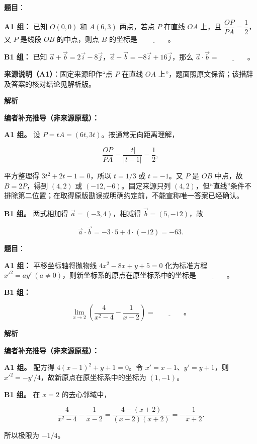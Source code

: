 \begin{answer}

\textbf{题目}：

\textbf{A1 组：} 已知 $O(0,0)$ 和 $A(6,3)$ 两点，若点 $P$ 在直线 $OA$ 上，且 $\dfrac{OP}{PA}=\dfrac12$，又 $P$ 是线段 $OB$ 的中点，则点 $B$ 的坐标是 $\underline{\qquad\qquad}$。

\textbf{B1 组：} 已知 $\vec a+\vec b=2\vec i-8\vec j$，$\vec a-\vec b=-8\vec i+16\vec j$，那么 $\vec a\cdot\vec b=\underline{\qquad\qquad}$。

\begin{gktip}
\textbf{来源说明（A1）}：固定来源印作“点 $P$ 在直线 $OA$ 上”，题面照原文保留；该措辞及答案的核对结论见解析版。
\end{gktip}

\textbf{解析}

\textbf{编者补充推导（非来源原载）：}

\textbf{A1 组。} 设 $P=tA=(6t,3t)$。按通常无向距离理解，

\nopagebreak[4]
\[\frac{OP}{PA}=\frac{|t|}{|t-1|}=\frac12,\]

平方整理得 $3t^2+2t-1=0$，所以 $t=1/3$ 或 $t=-1$。又 $P$ 是 $OB$ 中点，故 $B=2P$，得到 $(4,2)$ 或 $(-12,-6)$。固定来源只列 $(4,2)$，但“直线”条件不排除第二位置；在取得原版勘误或明确约定前，不能宣称唯一答案已经确认。

\textbf{B1 组。} 两式相加得 $\vec a=(-3,4)$，相减得 $\vec b=(5,-12)$，故

\nopagebreak[4]
\[\vec a\cdot\vec b=-3\cdot5+4\cdot(-12)=-63.\]


\end{answer}
\begin{answer}

\textbf{题目}：

\textbf{A1 组：} 平移坐标轴将抛物线 $4x^2-8x+y+5=0$ 化为标准方程 $x'^2=ay'\ (a\ne0)$，则新坐标系的原点在原坐标系中的坐标是 $\underline{\qquad\qquad}$。

\textbf{B1 组：}

\nopagebreak[4]
\[
\lim_{x\to2}\left(\dfrac{4}{x^2-4}-\dfrac{1}{x-2}\right)=\underline{\qquad\qquad}\mbox{。}
\]

\textbf{解析}

\textbf{编者补充推导（非来源原载）：}

\textbf{A1 组。} 配方得 $4(x-1)^2+y+1=0$。令 $x'=x-1$、$y'=y+1$，则 $x'^2=-y'/4$，故新原点在原坐标系中的坐标为 $(1,-1)$。

\textbf{B1 组。} 在 $x=2$ 的去心邻域中，

\nopagebreak[4]
\[\frac4{x^2-4}-\frac1{x-2}=\frac{4-(x+2)}{(x-2)(x+2)}=-\frac1{x+2}.\]

所以极限为 $-1/4$。


\end{answer}
